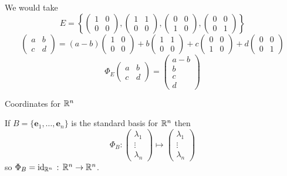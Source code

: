 \documentclass[10pt, a4paper]{article}
\newcommand{\mbf}[1]{\mathbf{#1}}
\begin{document}
\begin{example}
    We would take
    \[
    E = \left\{\begin{pmatrix}
        1 & 0 \\ 0 & 0
    \end{pmatrix}, \begin{pmatrix}
        1 & 1 \\ 0 & 0
    \end{pmatrix}, \begin{pmatrix}
        0 & 0 \\ 1 & 0
    \end{pmatrix}, \begin{pmatrix}
        0 & 0 \\ 0 & 1
    \end{pmatrix}\right\}
    \]
    \[
    \begin{pmatrix}
        a & b \\ c & d
    \end{pmatrix}
    =
    (a - b)\begin{pmatrix}
        1 & 0 \\ 0 & 0
    \end{pmatrix}
    +
    b\begin{pmatrix}
        1 & 1 \\ 0 & 0
    \end{pmatrix}
    +
    c\begin{pmatrix}
        0 & 0 \\ 1 & 0
    \end{pmatrix}
    +
    d\begin{pmatrix}
        0 & 0 \\ 0 & 1
    \end{pmatrix}
    \]
    \[
    \Phi_E\begin{pmatrix}
        a & b \\ c & d
    \end{pmatrix}
    =
    \begin{pmatrix}
        a - b \\ b \\ c \\ d
    \end{pmatrix}
    \]
\end{example}

Coordinates for $\mathbb{R} ^ n$

If $B = \{\mbf{e}_1, \dotsc, \mbf{e}_n\}$ is the standard basis for $\mathbb{R} ^ n$ then
\[
\Phi_B : \begin{pmatrix}
    \lambda_1 \\ \vdots \\ \lambda_n
\end{pmatrix}
\mapsto
\begin{pmatrix}
    \lambda_1 \\ \vdots \\ \lambda_n
\end{pmatrix}
\]
so $\Phi_B = \mathrm{id}_{\mathbb{R} ^ n}\,:\, \mathbb{R} ^ n \rightarrow \mathbb{R} ^ n$.
\end{document}
